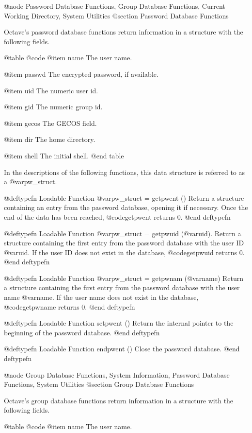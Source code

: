 {{@node Password Database Functions, Group Database Functions, Current Working Directory, System Utilities
@section Password Database Functions

Octave's password database functions return information in a structure
with the following fields.

@table @code
@item name
The user name.

@item passwd
The encrypted password, if available.

@item uid
The numeric user id.

@item gid
The numeric group id.

@item gecos
The GECOS field.

@item dir
The home directory.

@item shell
The initial shell.
@end table

In the descriptions of the following functions, this data structure is
referred to as a @var{pw_struct}.

@deftypefn {Loadable Function} {@var{pw_struct} = } getpwent ()
Return a structure containing an entry from the password database,
opening it if necessary. Once the end of the data has been reached,
@code{getpwent} returns 0.
@end deftypefn

@deftypefn {Loadable Function} {@var{pw_struct} = } getpwuid (@var{uid}).
Return a structure containing the first entry from the password database
with the user ID @var{uid}.  If the user ID does not exist in the
database, @code{getpwuid} returns 0.
@end deftypefn

@deftypefn {Loadable Function} {@var{pw_struct} = } getpwnam (@var{name})
Return a structure containing the first entry from the password database
with the user name @var{name}.  If the user name does not exist in the
database, @code{getpwname} returns 0.
@end deftypefn

@deftypefn {Loadable Function} {} setpwent ()
Return the internal pointer to the beginning of the password database.
@end deftypefn

@deftypefn {Loadable Function} {} endpwent ()
Close the password database.
@end deftypefn

@node Group Database Functions, System Information, Password Database Functions, System Utilities
@section Group Database Functions

Octave's group database functions return information in a structure
with the following fields.

@table @code
@item name
The user name.

}}
